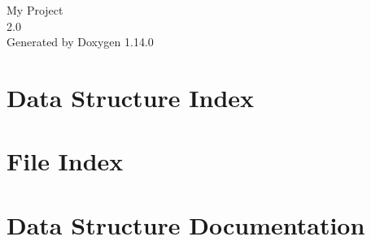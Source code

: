 \documentclass[twoside]{book}
\newcommand{\+}{\discretionary{\mbox{\scriptsize$\hookleftarrow$}}{}{}}
\newcommand{\clearemptydoublepage}{%
    \newpage{\pagestyle{empty}\cleardoublepage}%
  }
\begin{document}
  \raggedbottom
    \hypersetup{pageanchor=false,
                bookmarksnumbered=true,
                pdfencoding=unicode
               }
  \begin{titlepage}
  \vspace*{7cm}
  \begin{center}%
  {\Large My Project}\\
  [1ex]\large 2.\+0 \\
  \vspace*{1cm}
  {\large Generated by Doxygen 1.14.0}\\
  \end{center}
  \end{titlepage}
  \clearemptydoublepage
  \tableofcontents
  \clearemptydoublepage
  \hypersetup{pageanchor=true}
\chapter{Data Structure Index}

\chapter{File Index}

\chapter{Data Structure Documentation}












\end{document}
